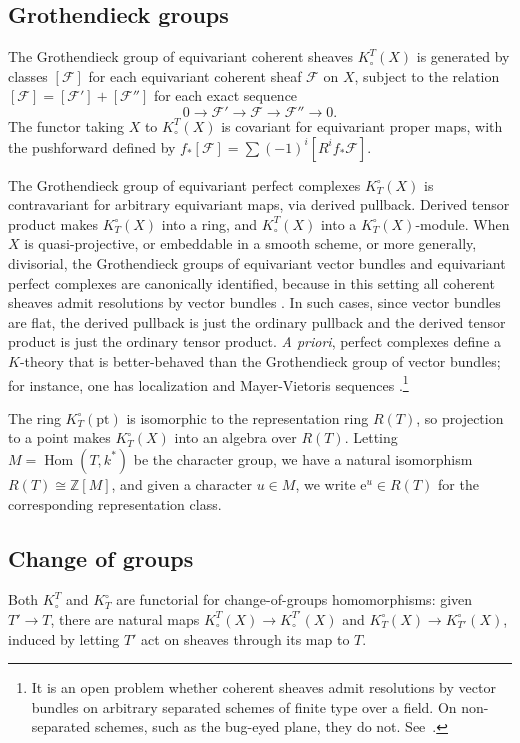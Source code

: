 \documentclass[11pt]{amsart}
\theoremstyle{definition}
\begin{document}
\subsection{Grothendieck groups}\label{ss.kgps} The Grothendieck group of equivariant coherent sheaves $K_\circ^T(X)$ is generated by classes $[{\mathscr{F}}]$ for each equivariant coherent sheaf ${\mathscr{F}}$ on $X$, subject to the relation $[{\mathscr{F}}]=[{\mathscr{F}}']+[{\mathscr{F}}'']$ for each exact sequence
\[
  0 \to {\mathscr{F}}' \to {\mathscr{F}} \to {\mathscr{F}}'' \to 0.
\]
The functor taking $X$ to $K_\circ^T(X)$ is covariant for equivariant proper maps, with the pushforward defined by $f_*[{\mathscr{F}}] = \sum (-1)^i[ R^if_*{\mathscr{F}} ]$.

The Grothendieck group of equivariant perfect complexes $K^\circ_T(X)$ is contravariant for arbitrary equivariant maps, via derived pullback.  Derived tensor product makes $K_T^\circ(X)$ into a ring, and $K^T_\circ(X)$ into a $K_T^\circ(X)$-module.  When $X$ is quasi-projective, or embeddable in a smooth scheme, or more generally, divisorial, the Grothendieck groups of equivariant vector bundles and equivariant perfect complexes are canonically identified, because in this setting all coherent sheaves admit resolutions by vector bundles \cite[Exp.~III, 2.2.9]{sga6}.  In such cases, since vector bundles are flat, the derived pullback is just the ordinary pullback and the derived tensor product is just the ordinary tensor product.  \emph{A priori}, perfect complexes define a $K$-theory that is better-behaved than the Grothendieck group of vector bundles; for instance, one has localization and Mayer-Vietoris sequences \cite{thomason-trobaugh}.\footnote{It is an open problem whether coherent sheaves admit resolutions by vector bundles on arbitrary separated schemes of finite type over a field.  On non-separated schemes, such as the bug-eyed plane, they do not.  See~\cite{resolution}.}

The ring $K_T^\circ({\mathrm{pt}})$ is isomorphic to the representation ring $R(T)$, so projection to a point makes $K_T^\circ(X)$ into an algebra over $R(T)$.  Letting $M=\operatorname{Hom}(T,{k}^*)$ be the character group, we have a natural isomorphism $R(T){\cong}{\mathbb{Z}}[M]$, and given a character $u\in M$, we write ${\mathrm{e}}^u\in R(T)$ for the corresponding representation class.

\subsection{Change of groups} Both $K^T_\circ$ and $K_T^\circ$ are functorial for change-of-groups homomorphisms: given $T' \to T$, there are natural maps $K^T_\circ(X) \to K^{T'}_\circ(X)$ and $K_T^\circ(X) \to K_{T'}^\circ(X)$, induced by letting $T'$ act on sheaves through its map to $T$.
\end{document}
